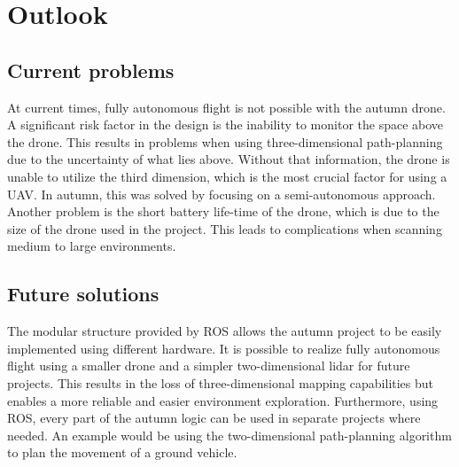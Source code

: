 \section{Outlook}

\subsection{Current problems}
At current times, fully autonomous flight is not possible with the autumn drone. A significant risk factor in the design is the inability to monitor the space above the drone. This results in problems when using three-dimensional path-planning due to the uncertainty of what lies above. Without that information, the drone is unable to utilize the third dimension, which is the most crucial factor for using a UAV. In autumn, this was solved by focusing on a semi-autonomous approach.  
Another problem is the short battery life-time of the drone, which is due to the size of the drone used in the project. This leads to complications when scanning medium to large environments.  

\subsection{Future solutions}
The modular structure provided by ROS allows the autumn project to be easily implemented using different hardware. It is possible to realize fully autonomous flight using a smaller drone and a simpler two-dimensional lidar for future projects. This results in the loss of three-dimensional mapping capabilities but enables a more reliable and easier environment exploration.\newline 
Furthermore, using ROS, every part of the autumn logic can be used in separate projects where needed.
An example would be using the two-dimensional path-planning algorithm to plan the movement of a ground vehicle. 

\filbreak